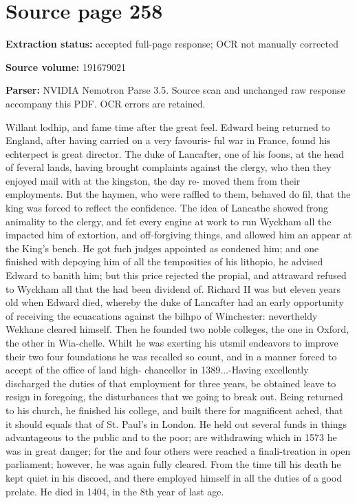 \clearpage
\section{Source page 258}
\textbf{Extraction status:} accepted full-page response; OCR not manually corrected\par
\textbf{Source volume:} 191679021\par
\textbf{Parser:} NVIDIA Nemotron Parse 3.5. Source scan and unchanged raw response accompany this PDF. OCR errors are retained.\par\medskip
Willant lodhip, and fame time after the great feel. Edward being returned to England, after having carried on a very favouris- ful war in France, found his echterpect is great director. The duke of Lancafter, one of his foons, at the head of feveral lands, having brought complaints against the clergy, who then they enjoyed mail with at the kingston, the day re- moved them from their employments. But the haymen, who were raffled to them, behaved do fil, that the king was forced to reflect the confidence. The idea of Lancathe showed frong animality to the clergy, and fet every engine at work to run Wyckham all the impacted him of extortion, and off-forgiving things, and allowed him an appear at the King's bench. He got fuch judges appointed as condened him; and one finished with depoying him of all the temposities of his lithopio, he advised Edward to banith him; but this price rejected the propial, and attraward refused to Wyckham all that the had been dividend of. Richard II was but eleven years old when Edward died, whereby the duke of Lancafter had an early opportunity of receiving the ecuacations against the bilhpo of Winchester: nevertheldy Wekhane cleared himself. Then he founded two noble colleges, the one in Oxford, the other in Wia-chelle. Whilt he was exerting his utsmil endeavors to improve their two four foundations he was recalled so count, and in a manner forced to accept of the office of land high- chancellor in 1389...-Having excellently discharged the duties of that employment for three years, be obtained leave to resign in foregoing, the disturbances that we going to break out. Being returned to his church, he finished his college, and built there for magnificent ached, that it should equals that of St. Paul’s in London. He held out several funds in things advantageous to the public and to the poor; are withdrawing which in 1573 he was in great danger; for the and four others were reached a finali-treation in open parliament; however, he was again fully cleared. From the time till his death he kept quiet in his discoed, and there employed himself in all the duties of a good prelate. He died in 1404, in the 8th year of last age.\par\medskip
